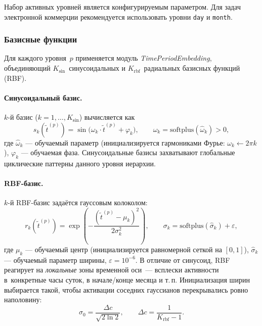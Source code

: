 Набор активных уровней является конфигурируемым параметром. Для задач электронной коммерции
рекомендуется использовать уровни \texttt{day} и \texttt{month}.

\subsubsection{Базисные функции}

Для каждого уровня~$p$ применяется модуль \textit{TimePeriodEmbedding}, объединяющий
$K_{\sin}$~синусоидальных и $K_{\mathrm{rbf}}$~радиальных базисных функций (RBF).

\paragraph{Синусоидальный базис.} $k$-й базис ($k = 1, \ldots, K_{\sin}$) вычисляется как
\begin{equation}
  s_k(\tilde{t}^{(p)}) = \sin\!\bigl(\omega_k \cdot \tilde{t}^{(p)} + \varphi_k\bigr),
  \qquad
  \omega_k = \mathrm{softplus}(\hat{\omega}_k) > 0,
\end{equation}
где $\hat{\omega}_k$ --- обучаемый параметр (инициализируется гармониками Фурье:
$\omega_k \leftarrow 2\pi k$), $\varphi_k$ --- обучаемая фаза.
Синусоидальные базисы захватывают глобальные циклические паттерны данного уровня иерархии.

\paragraph{RBF-базис.} $k$-й RBF-базис задаётся гауссовым колоколом:
\begin{equation}
  r_k(\tilde{t}^{(p)})
  = \exp\!\left(-\frac{(\tilde{t}^{(p)} - \mu_k)^2}{2\sigma_k^2}\right),
  \qquad
  \sigma_k = \mathrm{softplus}(\hat{\sigma}_k) + \varepsilon,
\end{equation}
где $\mu_k$ --- обучаемый центр (инициализируется равномерной сеткой на $[0,1]$),
$\hat{\sigma}_k$ --- обучаемый параметр ширины, $\varepsilon = 10^{-6}$.
В отличие от синусоид, RBF реагирует на \emph{локальные} зоны временной оси~--- всплески
активности в~конкретные часы суток, в начале/конце месяца и т.\,п. Инициализация ширин
выбирается такой, чтобы активации соседних гауссианов перекрывались ровно наполовину:
\begin{equation}
  \sigma_0 = \frac{\Delta c}{\sqrt{2\ln 2}},
  \qquad
  \Delta c = \frac{1}{K_{\mathrm{rbf}} - 1}.
\end{equation}

